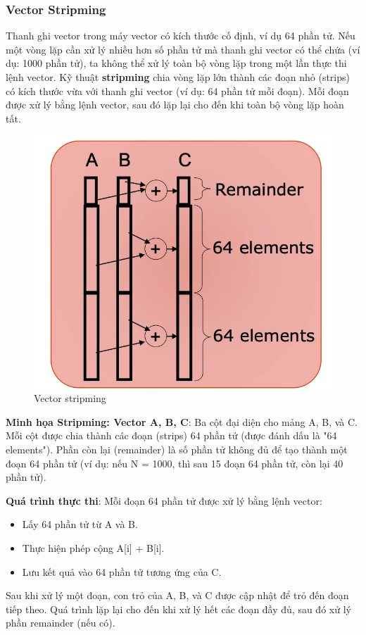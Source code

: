 \documentclass[a4paper]{article}
\begin{document}
\subsubsection{Vector Stripming}
Thanh ghi vector trong máy vector có kích thước cố định, ví dụ 64 phần tử. Nếu một vòng lặp cần xử lý nhiều hơn số phần tử mà thanh ghi vector có thể chứa (ví dụ: 1000 phần tử), ta không thể xử lý toàn bộ vòng lặp trong một lần thực thi lệnh vector. Kỹ thuật \textbf{stripming} chia vòng lặp lớn thành các đoạn nhỏ (strips) có kích thước vừa với thanh ghi vector (ví dụ: 64 phần tử mỗi đoạn). Mỗi đoạn được xử lý bằng lệnh vector, sau đó lặp lại cho đến khi toàn bộ vòng lặp hoàn tất.
\begin{multicols}{2}
\begin{figure}[H]
    \centering
    \includegraphics[width=1\linewidth]{assets/vector-stripming.png}
    \caption{Vector stripming}
    \label{fig:enter-label}
\end{figure}
\columnbreak
\textbf{Minh họa Stripming: Vector A, B, C}: Ba cột đại diện cho mảng A, B, và C. Mỗi cột được chia thành các đoạn (strips) 64 phần tử (được đánh dấu là "64 elements"). Phần còn lại (remainder) là số phần tử không đủ để tạo thành một đoạn 64 phần tử (ví dụ: nếu N = 1000, thì sau 15 đoạn 64 phần tử, còn lại 40 phần tử).

\textbf{Quá trình thực thi}: Mỗi đoạn 64 phần tử được xử lý bằng lệnh vector:
\begin{itemize}
    \item Lấy 64 phần tử từ A và B.
    \item Thực hiện phép cộng A[i] + B[i].
    \item Lưu kết quả vào 64 phần tử tương ứng của C.
\end{itemize}
Sau khi xử lý một đoạn, con trỏ của A, B, và C được cập nhật để trỏ đến đoạn tiếp theo. Quá trình lặp lại cho đến khi xử lý hết các đoạn đầy đủ, sau đó xử lý phần remainder (nếu có).
\end{multicols}
\end{document}

